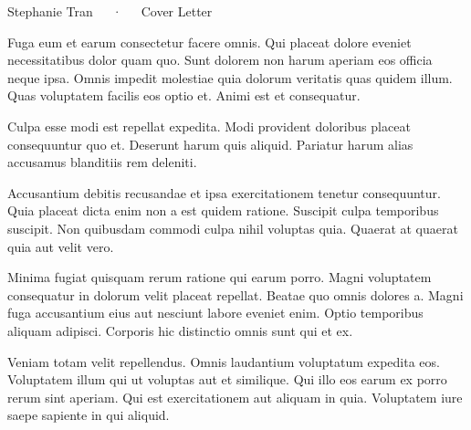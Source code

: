 \documentclass[11pt, a4paper]{awesome-cv}
\begin{document}
\makecvheader[C]

\makecvfooter
  {}
  {Stephanie Tran~~~·~~~Cover Letter}
  {}

\makelettertitle

\begin{cvletter}
    
Fuga eum et earum consectetur facere omnis. Qui placeat dolore eveniet necessitatibus dolor quam quo. Sunt dolorem non harum aperiam eos officia neque ipsa. Omnis impedit molestiae quia dolorum veritatis quas quidem illum. Quas voluptatem facilis eos optio et. Animi est et consequatur.

Culpa esse modi est repellat expedita. Modi provident doloribus placeat consequuntur quo et. Deserunt harum quis aliquid. Pariatur harum alias accusamus blanditiis rem deleniti.

Accusantium debitis recusandae et ipsa exercitationem tenetur consequuntur. Quia placeat dicta enim non a est quidem ratione. Suscipit culpa temporibus suscipit. Non quibusdam commodi culpa nihil voluptas quia. Quaerat at quaerat quia aut velit vero.

Minima fugiat quisquam rerum ratione qui earum porro. Magni voluptatem consequatur in dolorum velit placeat repellat. Beatae quo omnis dolores a. Magni fuga accusantium eius aut nesciunt labore eveniet enim. Optio temporibus aliquam adipisci. Corporis hic distinctio omnis sunt qui et ex.

Veniam totam velit repellendus. Omnis laudantium voluptatum expedita eos. Voluptatem illum qui ut voluptas aut et similique. Qui illo eos earum ex porro rerum sint aperiam. Qui est exercitationem aut aliquam in quia. Voluptatem iure saepe sapiente in qui aliquid.




\end{cvletter}


\makeletterclosing
\end{document}
